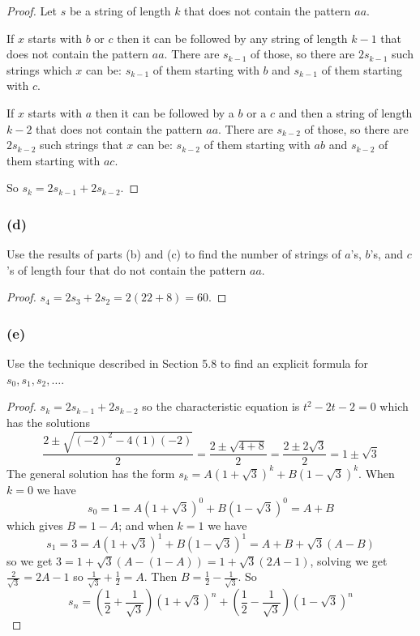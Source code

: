 \documentclass[14pt]{extarticle}
\begin{document}
\begin{proof}
     Let $s$ be a string of length $k$ that does not contain the pattern $aa$.

     If $x$ starts with $b$ or $c$ then it can be followed by any string of length $k-1$ that does not contain the
     pattern $aa$. There are \(s_{k-1}\) of those, so there are \(2s_{k-1}\) such strings which $x$ can be: \(s_{k-1}\) of
     them starting with $b$ and \(s_{k-1}\) of them starting with $c$.

     If $x$ starts with $a$ then it can be followed by a $b$ or a $c$ and then a string of length $k-2$ that does not
     contain the pattern $aa$. There are \(s_{k-2}\) of those, so there are \(2s_{k-2}\) such strings that $x$ can be:
     \(s_{k-2}\) of them starting with $ab$ and \(s_{k-2}\) of them starting with $ac$.

     So \(s_k = 2s_{k-1} + 2s_{k-2}\).
\end{proof}

\subsubsection{(d)}
Use the results of parts (b) and (c) to find the number of strings of $a$’s, $b$’s, and $c$’s of length four that do
not contain the pattern $aa$.

\begin{proof}
     \(s_4 = 2s_3 + 2s_2 = 2(22+8) = 60\).
\end{proof}

\subsubsection{(e)}
Use the technique described in Section 5.8 to find an explicit formula for \(s_0, s_1, s_2, \ldots\).

\begin{proof}
     \(s_k = 2s_{k-1} + 2s_{k-2}\) so the characteristic equation is \(t^2 - 2t-2 = 0\) which has the solutions
     \[
          \frac{2 \pm \sqrt{(-2)^2 - 4(1)(-2)}}{2} = \frac{2 \pm \sqrt{4+8}}{2} = \frac{2 \pm 2\sqrt{3}}{2} = 1 \pm \sqrt{3}
     \]
     The general solution has the form \(s_k = A(1+\sqrt{3})^k + B(1-\sqrt{3})^k\). When $k=0$ we have
     \[
          s_0 = 1 = A(1+\sqrt{3})^0 + B(1-\sqrt{3})^0 = A+B
     \]
     which gives $B = 1-A$; and when $k=1$ we have
     \[
          s_1 = 3 = A(1+\sqrt{3})^1 + B(1-\sqrt{3})^1 = A+B + \sqrt{3}(A-B)
     \]
     so we get \(3 = 1 + \sqrt{3}(A - (1-A)) = 1+\sqrt{3}(2A-1)\), solving we get \(\frac{2}{\sqrt{3}} = 2A-1\) so
     \(\frac{1}{\sqrt{3}} + \frac{1}{2} = A\). Then \(B = \frac{1}{2} - \frac{1}{\sqrt{3}}\). So
     \[
          s_n = \left(\frac{1}{2} + \frac{1}{\sqrt{3}}\right)(1+\sqrt{3})^n + \left(\frac{1}{2} - \frac{1}{\sqrt{3}}\right)
          (1-\sqrt{3})^n
     \]
\end{proof}
\end{document}
